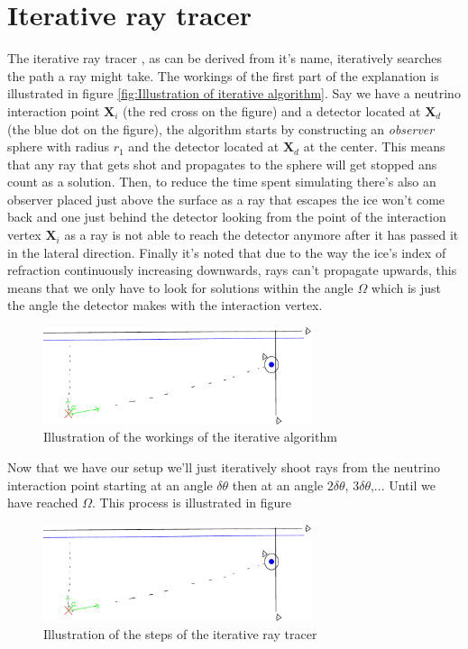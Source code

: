\documentclass[11pt,a4paper,faculty=we,language=en,doctype=report]{cls/ugent-doc}
\begin{document}
\section{Iterative ray tracer}
\label{sec:Iterative}
The iterative ray tracer \cite{2022icrc.confE1027O}, as can be derived from
it's name, iteratively searches the path a ray might take. The workings of the
first part of the explanation is illustrated in figure \ref{fig:Illustration of
iterative algorithm}.  Say we have a neutrino interaction point $\mathbf{X}_i$
(the red cross on the figure) and a detector located at $\mathbf{X}_d$ (the
blue dot on the figure), the algorithm starts by constructing an
\textit{observer} sphere with radius $r_1$ and the detector located at $\mathbf{X}_d$ at the
center.  This means that any ray that gets shot and propagates to the sphere
will get stopped ans count as a solution.  Then, to reduce the time spent simulating there's also an observer placed
just above the surface as a ray that escapes the ice won't come back and one
just behind the detector looking from the point of the interaction vertex $\mathbf{X}_i$ as
a ray is not able to reach the detector anymore after it has passed it in the
lateral direction. Finally it's noted that due to the way the ice's index of refraction
continuously increasing downwards, rays can't propagate upwards, this means that we only 
have to look for solutions within the angle $\Omega$ which is just the angle the detector
makes with the interaction vertex.
\begin{figure}
  \centering
  \includegraphics[width=0.7\textwidth]{algoillu.pdf}
  \caption{Illustration of the workings of the iterative algorithm}
  \label{fig:Illustration of iterative algorithm}
\end{figure}
Now that we have our setup we'll just iteratively shoot rays from
the neutrino interaction point starting at an angle $\delta \theta$ 
then at an angle $2\delta \theta$, $3\delta \theta$,... Until
we have reached $\Omega$. This process is illustrated in figure 
\begin{figure}
  \centering
  \includegraphics[width=0.7\textwidth]{algoillu.pdf}
  \caption{Illustration of the steps of the iterative ray tracer}
  \label{fig:IlluIterative}
\end{figure}
\end{document}

